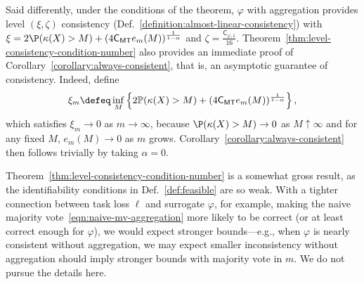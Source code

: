\documentclass[11pt]{article}
\newcommand{\Prb}{\mathbb{P}}
\newcommand{\constant}{\mathsf{C}}  %
\newcommand{\cstMT}{\constant_{\mathsf{MT}}}
\newcommand{\tloss}{\ell}  %
\newcommand{\sloss}{\varphi}  %
\begin{document}
Said differently, under the conditions of the theorem, $\sloss$ with
aggregation provides level $(\xi,\zeta)$ consistency
(Def.~\ref{definition:almost-linear-consistency}) with $\xi = 2 \P(\kappa(X)
> M) + (4 \cstMT e_m(M))^\frac{1}{1 - \alpha}$ and $\zeta =
\frac{\constant_{\sloss,1}}{16}$.
%
Theorem~\ref{thm:level-consistency-condition-number} also
provides an immediate proof of Corollary~\ref{corollary:always-consistent},
that is, an asymptotic guarantee of consistency.
%
Indeed, define
\begin{align*}
  \xi_m \defeq \inf_{M}
  \left\{ 2\Prb(\kappa(X) > M) +   (4\cstMT e_m(M))^{\frac{1}{1-\alpha}} \right\},
\end{align*}
which satisfies $\xi_m \to 0$ as $m \to \infty$,
because $\P(\kappa(X) > M) \to 0$ as $M \uparrow \infty$ and
for any fixed $M$, $e_m(M) \to 0$ as $m$ grows.
%
Corollary~\ref{corollary:always-consistent}
then follows trivially by taking $\alpha = 0$.

Theorem~\ref{thm:level-consistency-condition-number}
is a somewhat gross result, as the identifiability
conditions in Def.~\ref{def:feasible} are so weak.
%
With a tighter connection between task loss $\tloss$ and surrogate $\sloss$,
for example, making the naive majority vote~\eqref{eqn:naive-mv-aggregation}
more likely to be correct (or at least correct enough for $\sloss$),
we would expect stronger bounds---e.g., when $\varphi$ is nearly consistent
without aggregation, we may expect smaller inconsistency without aggregation
should imply stronger bounds with majority vote in $m$.
%
We do not pursue the details here.

\end{document}
